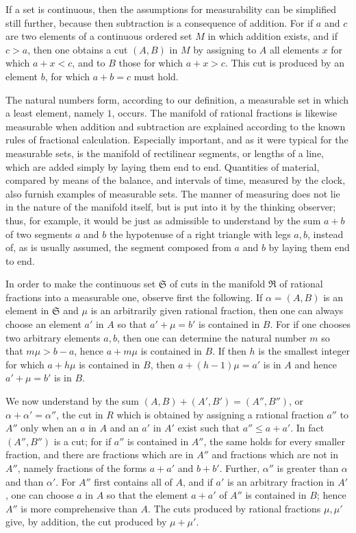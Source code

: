 \documentclass[11pt]{article}
\begin{document}
If a set is continuous, then the assumptions for measurability can be simplified still further, because then subtraction is a consequence of addition. For if $a$ and $c$ are two elements of a continuous ordered set $M$ in which addition exists, and if $c>a$, then one obtains a cut $(A,B)$ in $M$ by assigning to $A$ all elements $x$ for which $a+x<c$, and to $B$ those for which $a+x>c$. This cut is produced by an element $b$, for which $a+b=c$ must hold.

The natural numbers form, according to our definition, a measurable set in which a least element, namely $1$, occurs. The manifold of rational fractions is likewise measurable when addition and subtraction are explained according to the known rules of fractional calculation. Especially important, and as it were typical for the measurable sets, is the manifold of rectilinear segments, or lengths of a line, which are added simply by laying them end to end. Quantities of material, compared by means of the balance, and intervals of time, measured by the clock, also furnish examples of measurable sets. The manner of measuring does not lie in the nature of the manifold itself, but is put into it by the thinking observer; thus, for example, it would be just as admissible to understand by the sum $a+b$ of two segments $a$ and $b$ the hypotenuse of a right triangle with legs $a,b$, instead of, as is usually assumed, the segment composed from $a$ and $b$ by laying them end to end.

In order to make the continuous set $\mathfrak S$ of cuts in the manifold $\mathfrak R$ of rational fractions into a measurable one, observe first the following. If $\alpha=(A,B)$ is an element in $\mathfrak S$ and $\mu$ is an arbitrarily given rational fraction, then one can always choose an element $a'$ in $A$ so that $a'+\mu=b'$ is contained in $B$. For if one chooses two arbitrary elements $a,b$, then one can determine the natural number $m$ so that $m\mu>b-a$, hence $a+m\mu$ is contained in $B$. If then $h$ is the smallest integer for which $a+h\mu$ is contained in $B$, then $a+(h-1)\mu=a'$ is in $A$ and hence $a'+\mu=b'$ is in $B$.

We now understand by the sum $(A,B)+(A',B')=(A'',B'')$, or $\alpha+\alpha'=\alpha''$, the cut in $R$ which is obtained by assigning a rational fraction $a''$ to $A''$ only when an $a$ in $A$ and an $a'$ in $A'$ exist such that $a''\le a+a'$. In fact $(A'',B'')$ is a cut; for if $a''$ is contained in $A''$, the same holds for every smaller fraction, and there are fractions which are in $A''$ and fractions which are not in $A''$, namely fractions of the forms $a+a'$ and $b+b'$. Further, $\alpha''$ is greater than $\alpha$ and than $\alpha'$. For $A''$ first contains all of $A$, and if $a'$ is an arbitrary fraction in $A'$, one can choose $a$ in $A$ so that the element $a+a'$ of $A''$ is contained in $B$; hence $A''$ is more comprehensive than $A$. The cuts produced by rational fractions $\mu,\mu'$ give, by addition, the cut produced by $\mu+\mu'$.
\end{document}
